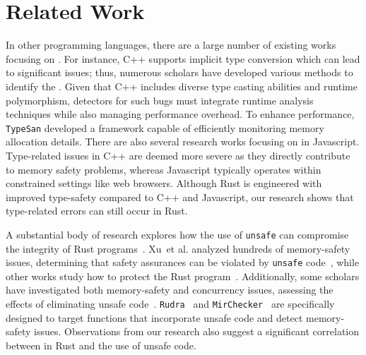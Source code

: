 \section{Related Work}
 In other programming languages, there are a large number of existing works focusing on \bugs. 
For instance, C++ supports implicit type conversion which can lead to significant issues; thus, numerous scholars have developed various methods to identify the \bugs \cite{jeon2017hextype, haller2016typesan, duck2018effectivesan, lee2015type}. 
Given that C++ includes diverse type casting abilities and runtime polymorphism,
detectors for such bugs must integrate runtime analysis techniques while also managing performance overhead. 
To enhance performance, \texttt{TypeSan}\cite{haller2016typesan} developed a framework capable of efficiently monitoring memory allocation details. 
There are also several research works focusing on \bugs in Javascript\cite{pradel2015typedevil, 9842686, 7958598}. 
Type-related issues in C++ are deemed more severe as they directly contribute to memory safety problems, whereas Javascript typically operates within constrained settings like web browsers. 
Although Rust is engineered with improved type-safety compared to C++ and Javascript, our research shows that type-related errors can still occur in Rust.


\vspace{0.05in}
A substantial body of research explores how the use of \texttt{unsafe} can compromise the integrity of Rust programs~\cite{Qin2020ReplicationPF, Evans2020IsRU, Xu2020MemorySafetyCC, zhang2022towards, papaevripides2021exploiting, mergendahl2022cross, rivera2021keeping, kirth2022pkru}. 
Xu~et al. analyzed hundreds of memory-safety issues, determining that safety assurances can be violated by \texttt{unsafe} code~\cite{Xu2020MemorySafetyCC}, while other works study how to protect the Rust program~\cite{rivera2021keeping, kirth2022pkru}. 
Additionally, some scholars have investigated both memory-safety and concurrency issues, assessing the effects of eliminating unsafe code~\cite{Qin2020ReplicationPF}. 
\texttt{Rudra}~\cite{Yechan2021Rudra} and \texttt{MirChecker}~\cite{Zhuohua2021MirChecker} are specifically designed to target functions that incorporate unsafe code
and detect memory-safety issues.
%
Observations from our research also suggest a significant correlation between  \bugs in Rust and the use of unsafe code. 
